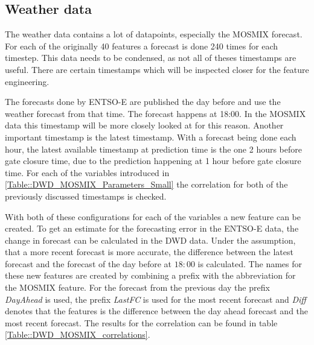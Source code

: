 \documentclass[class=scrbook, crop=false]{standalone}
\begin{document}
    \subsection{Weather data}
    \label{Section::Weather_data}
    The weather data contains a lot of datapoints, especially the MOSMIX forecast. 
    For each of the originally 40 features a forecast is done 240 times for each timestep. 
    This data needs to be condensed, as not all of theses timestamps are useful.
    There are certain timestamps which will be inspected closer for the feature engineering.
    
    The forecasts done by ENTSO-E are published the day before and use the weather forecast from that time.
    The forecast happens at 18:00. 
    In the MOSMIX data this timestamp will be more closely looked at for this reason.
    Another important timestamp is the latest timestamp. 
    With a forecast being done each hour, the latest available timestamp at prediction time is the one 2 hours before gate closure time, due to the prediction happening at 1 hour before gate closure time.
    For each of the variables introduced in \ref{Table::DWD_MOSMIX_Parameters_Small} the correlation for both of the previously discussed timestamps is checked.
    
    With both of these configurations for each of the variables a new feature can be created. 
    To get an estimate for the forecasting error in the ENTSO-E data, the change in forecast can be calculated in the DWD data.
    Under the assumption, that a more recent forecast is more accurate, the difference between the latest forecast and the forecast of the day before at $18:00$ is calculated.
    The names for these new features are created by combining a prefix with the abbreviation for the MOSMIX feature.
    For the forecast from the previous day the prefix \textit{DayAhead} is used, the prefix \textit{LastFC} is used for the most recent forecast and \textit{Diff} denotes that the features is the difference between the day ahead forecast and the most recent forecast.
    The results for the correlation can be found in table \ref{Table::DWD_MOSMIX_correlations}. 
    
\end{document}
